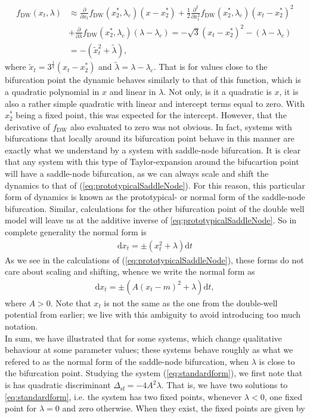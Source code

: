 \begin{align}
    f_{\mathrm{DW}}(x_t,\lambda)&\approx \frac{\partial}{\partial x_t}f_{\mathrm{DW}}(x_2^*,\lambda_c)(x-x_2^*) + \frac{1}{2}\frac{\partial^2}{\partial x_t^2}f_{\mathrm{DW}}(x_2^*,\lambda_c)(x_t-x_2^*)^2 \nonumber \\
     &+ \frac{\partial}{\partial \lambda}f_{\mathrm{DW}}(x_2^*,\lambda_c)(\lambda - \lambda_c) = -\sqrt{3}\left(x_t-x_2^*\right)^2 - \left(\lambda - \lambda_c\right) \nonumber \\&= -\left(\tilde{x}_t^2 + \tilde{\lambda}\right), \label{eq:prototypicalSaddleNode}
\end{align}
where $\tilde{x}_t = 3^{\frac{1}{4}}\left(x_t-x_2^*\right)$ and  $\tilde{\lambda} = \lambda - \lambda_c$. That is for values close to the bifurcation point the dynamic behaves similarly to that of this function, which is a quadratic polynomial in $x$ and linear in $\lambda$. Not only, is it a quadratic is $x$, it is also a rather simple quadratic with linear and intercept terms equal to zero. With $x_2^*$ being a fixed point, this was expected for the intercept. However, that the derivative of $f_{\mathrm{DW}}$ also evaluated to zero was not obvious. In fact, systems with bifurcations that locally around its bifurcation point behave in this manner are exactly what we understand by a system with saddle-node bifurcation. It is clear that any system with this type of Taylor-expansion around the bifucartion point will have a saddle-node bifurcation, as we can always scale and shift the dynamics to that of (\ref{eq:prototypicalSaddleNode}). For this reason, this particular form of dynamics is known as the prototypical- or normal form of the saddle-node bifurcation. Similar, calculations for the other bifurcation point of the double well model will leave us at the additive inverse of \ref{eq:prototypicalSaddleNode}. So in complete generality the normal form is
\begin{align}
    \mathrm{d}x_t = \pm\left(x_t^2 + \lambda\right)\mathrm{d}t
\end{align} 
As we see in the calculations of (\ref{eq:prototypicalSaddleNode}), these forms do not care about scaling and shifting, whence we write the normal form as
\begin{align}
    \mathrm{d}x_t = \pm\left(A\left(x_t - m\right)^2 + \lambda\right)\mathrm{d}t, \label{eq:standardform}
\end{align}
where $A>0$. Note that $x_t$ is not the same as the one from the double-well potential from earlier; we live with this ambiguity to avoid introducing too much notation.\\ In sum, we have illustrated that for some systems, which change qualitative behaviour at some parameter values; these systems behave roughly as what we refered to as the normal form of the saddle-node bifurcation, when $\lambda$ is close to the bifurcation point. Studying the system (\ref{eq:standardform}), we first note that is has quadratic discriminant $\Delta_{\mathrm{sf}} = -4A^2\lambda$. That is, we have two solutions to \ref{eq:standardform}, i.e. the system has two fixed points, whenever $\lambda<0$, one fixed point for $\lambda = 0$ and zero otherwise. When they exist, the fixed points are given by
